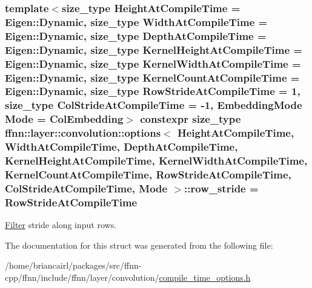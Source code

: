 \hypertarget{structffnn_1_1layer_1_1convolution_1_1options_af557eea786920cd6341ca8a0498d3791}{
\subsubsection[{row\-\_\-stride}]{\setlength{\rightskip}{0pt plus 5cm}template$<$size\-\_\-type Height\-At\-Compile\-Time = Eigen\-::\-Dynamic, size\-\_\-type Width\-At\-Compile\-Time = Eigen\-::\-Dynamic, size\-\_\-type Depth\-At\-Compile\-Time = Eigen\-::\-Dynamic, size\-\_\-type Kernel\-Height\-At\-Compile\-Time = Eigen\-::\-Dynamic, size\-\_\-type Kernel\-Width\-At\-Compile\-Time = Eigen\-::\-Dynamic, size\-\_\-type Kernel\-Count\-At\-Compile\-Time = Eigen\-::\-Dynamic, size\-\_\-type Row\-Stride\-At\-Compile\-Time = 1, size\-\_\-type Col\-Stride\-At\-Compile\-Time = -\/1, Embedding\-Mode Mode = Col\-Embedding$>$ constexpr {\bf size\-\_\-type} {\bf ffnn\-::layer\-::convolution\-::options}$<$ Height\-At\-Compile\-Time, Width\-At\-Compile\-Time, Depth\-At\-Compile\-Time, Kernel\-Height\-At\-Compile\-Time, Kernel\-Width\-At\-Compile\-Time, Kernel\-Count\-At\-Compile\-Time, Row\-Stride\-At\-Compile\-Time, Col\-Stride\-At\-Compile\-Time, Mode $>$\-::row\-\_\-stride = Row\-Stride\-At\-Compile\-Time\hspace{0.3cm}{\ttfamily [static]}}}\label{structffnn_1_1layer_1_1convolution_1_1options_af557eea786920cd6341ca8a0498d3791}


\hyperlink{classffnn_1_1layer_1_1convolution_1_1_filter}{Filter} stride along input rows. 



The documentation for this struct was generated from the following file\-:\begin{DoxyCompactItemize}
\item 
/home/briancairl/packages/src/ffnn-\/cpp/ffnn/include/ffnn/layer/convolution/\hyperlink{convolution_2compile__time__options_8h}{compile\-\_\-time\-\_\-options.\-h}\end{DoxyCompactItemize}
